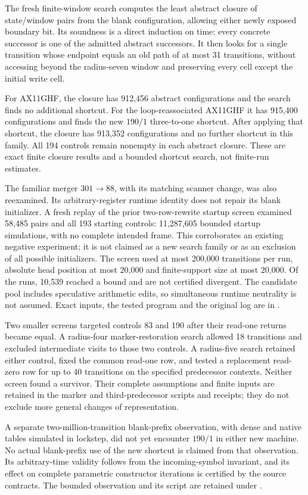 The fresh finite-window search computes the least abstract closure of
state/window pairs from the blank configuration, allowing either newly
exposed boundary bit. Its soundness is a direct induction on time: every
concrete successor is one of the admitted abstract successors. It then
looks for a single transition whose endpoint equals an old path of at most
31 transitions, without accessing beyond the radius-seven window and
preserving every cell except the initial write cell.

For AX11GHF, the closure has 912,456 abstract configurations and the search
finds no additional shortcut. For the loop-reassociated AX11GHF it has
915,400 configurations and finds the new $190/1$ three-to-one shortcut.
After applying that shortcut, the closure has 913,352 configurations and
no further shortcut in this family. All 194 controls remain nonempty in
each abstract closure. These are exact finite closure results and a bounded
shortcut search, not finite-run estimates.

The familiar merger $301\to88$, with its matching scanner change, was
also reexamined. Its arbitrary-register runtime identity does not repair
its blank initializer. A fresh replay of the prior two-row-rewrite startup
screen examined 58,485 pairs and all 193 starting controls: 11,287,605
bounded startup simulations, with no complete intended frame. This
corroborates an existing negative experiment; it is not claimed as a new
search family or as an exclusion of all possible initializers. The screen
used at most 200,000 transitions per run, absolute head position at most
20,000 and finite-support size at most 20,000. Of the runs, 10,539 reached
a bound and are not certified divergent. The candidate pool includes
speculative arithmetic edits, so simultaneous runtime neutrality is not
assumed. Exact inputs, the tested program and the original log are in
.

Two smaller screens targeted controls 83 and 190 after their read-one
returns became equal. A radius-four marker-restoration search allowed
18 transitions and excluded intermediate visits to those two controls.
A radius-five search retained either control, fixed the common read-one
row, and tested a replacement read-zero row for up to 40 transitions on
the specified predecessor contexts. Neither screen found a survivor.
Their complete assumptions and finite inputs are retained in the marker
and third-predecessor scripts and receipts; they do not exclude more
general changes of representation.

A separate two-million-transition blank-prefix observation, with dense and
native tables simulated in lockstep, did not yet encounter $190/1$ in
either new machine. No actual blank-prefix use of the new shortcut is
claimed from that observation. Its arbitrary-time validity follows from
the incoming-symbol invariant, and its effect on complete parametric
constructor iterations is certified by the source contracts. The bounded
observation and its script are retained under .


